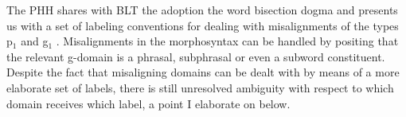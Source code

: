 \documentclass[output=paper,hidelinks]{langscibook}
\begin{document}

The PHH shares with BLT the adoption the word bisection dogma and presents us with a set of labeling conventions for dealing with misalignments of the types p$_1$   and g$_1$  . Misalignments in the morphosyntax can be handled by positing that the relevant g-domain is a phrasal, subphrasal or even a subword constituent. Despite the fact that misaligning domains can be dealt with by means of a more elaborate set of labels, there is still unresolved ambiguity with respect to which domain receives which label, a point I elaborate on below.

\end{document}

